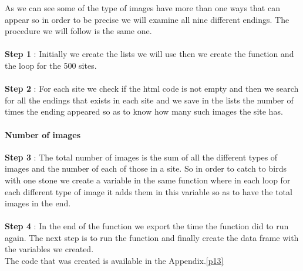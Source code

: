 \documentclass{article}
\begin{document}
As we can see some of the type of images have more than one ways that can appear so in order to be precise we will examine all nine different endings. The procedure we will follow is the same one. \\\\
\textbf{Step 1} : Initially we create the lists we will use then we create the function and the loop for the 500 sites.\\\\
\textbf{Step 2} :  For each site we check if the html code is not empty and then we search for all the endings that exists in each site and we save in the lists the number of times the ending appeared so as to know how many such images the site has.
\paragraph{Number of images}
\textbf{Step 3} : The total number of images is the sum of all the different types of images and the number of each of those in a site. So in order to catch to birds with one stone we create a variable in the same function where in each loop for each different type of image it adds them in this variable so as to have the total images in the end.\\\\
\textbf{Step 4} : In the end of the function we export the time the function did to run again. The next step is to run the function and finally create the data frame with the variables we created.\\
The code that was created is available in the Appendix.\ref{p13}
\end{document}
